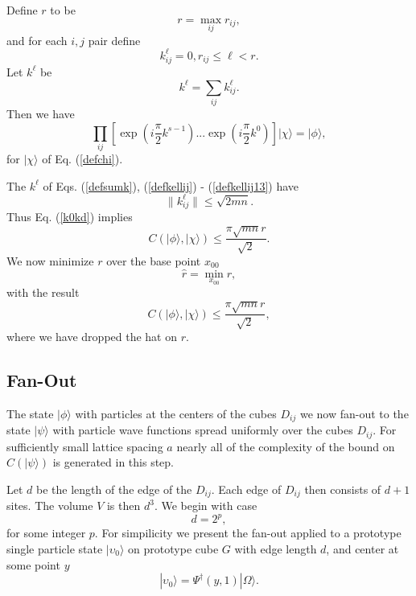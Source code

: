 \documentclass[12pt,amsmath,amssymb,onecolumn]{revtex4-2}
\begin{document}
Define $r$ to be
\begin{equation}
  \label{defs}
  r = \max_{ij} r_{ij},
\end{equation}
and for each $i, j$ pair define
\begin{equation}
  \label{extendk}
  k ^\ell_{ij} = 0, r_{ij} \le \ell < r.
\end{equation}
Let $k^\ell$ be
\begin{equation}
  \label{defsumk}
  k^\ell = \sum_{ij} k^\ell_{ij}.
\end{equation}
Then we have
\begin{equation}
\label{k0kd}
\prod_{ij}[ \exp( i\frac{\pi}{2} k^{s-1}) ... \exp( i\frac{\pi}{2} k^0)] |\chi \rangle  = |\phi \rangle ,
\end{equation}
for $|\chi \rangle $ of Eq. (\ref{defchi}).


The $k^\ell$ of Eqs. (\ref{defsumk}), (\ref{defkellij}) - (\ref{defkellij13}) have
\begin{equation}
\label{normk0kd}
\parallel k^\ell_{ij} \parallel \le  \sqrt{2 mn}.
\end{equation}
Thus  Eq. (\ref{k0kd}) implies
\begin{equation}
\label{deltac0}
C( |\phi \rangle , |\chi \rangle ) \le \frac{ \pi \sqrt{mn} r}{\sqrt{2}} .
\end{equation}
We now minimize $r$ over the base point $x_{00}$ 
\begin{equation}
  \label{defdd}
  \hat{r} = \min_{x_{00}} r,
\end{equation}
with the result
\begin{equation}
\label{deltac1}
C( |\phi \rangle , |\chi \rangle ) \le \frac{ \pi \sqrt{mn} r}{\sqrt{2}},
\end{equation}
where we have dropped the hat on $r$.

\subsection{\label{app:fanout}Fan-Out}

The state $|\phi \rangle $ with particles at the centers of the cubes $D_{ij}$ we now fan-out
to the state $|\psi \rangle $ with particle wave functions spread uniformly over the
cubes $D_{ij}$. For sufficiently small lattice spacing $a$ nearly all of the complexity of
the bound on $C(|\psi \rangle )$ is generated in this step.

Let $d$ be the length of the edge of the $D_{ij}$. Each edge of
$D_{ij}$ then consists of $d+1$ sites. The volume $V$ is then $d^3$. We begin with case
\begin{equation}
\label{rpower2}
d = 2^p,  
\end{equation}
for some integer $p$. For simpilicity we present the fan-out applied to
a prototype single particle state $|\upsilon_0 \rangle $ on prototype cube $G$ with edge length $d$,
and center at some point $y$
\begin{equation}
\label{defupsilon0}
|\upsilon_0 \rangle  =  \Psi^{\dagger}( y, 1) |\Omega \rangle .
\end{equation}
\end{document}
